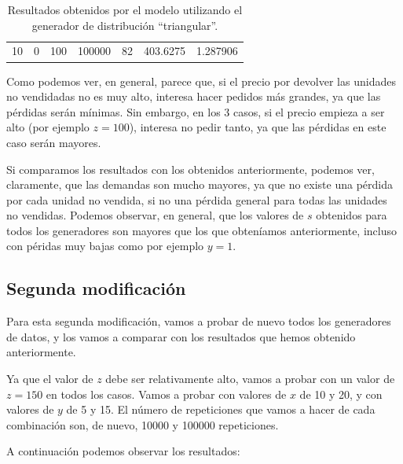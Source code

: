 \documentclass[11pt,a4paper]{report}
\begin{document}
\begin{table}[H]
{\begin{tabular}{c|c|c|c|c|c|c}
10                                                                                   & 0                                                                                      & 100                                                                        & 100000                                                                    & 82                                                                                        & 403.6275                                                                  & 1.287906             
\end{tabular}%
}
\caption{Resultados obtenidos por el modelo utilizando el generador de distribución ``triangular''.}
\label{tabla6}
\end{table}

Como podemos ver, en general, parece que, si el precio por devolver las unidades no vendidadas no es muy alto, interesa hacer
pedidos más grandes, ya que las pérdidas serán mínimas. Sin embargo, en los 3 casos, si el precio empieza a ser alto (por ejemplo
$z = 100$), interesa no pedir tanto, ya que las pérdidas en este caso serán mayores.

Si comparamos los resultados con los obtenidos anteriormente, podemos ver, claramente, que las demandas son mucho mayores, ya
que no existe una pérdida por cada unidad no vendida, si no una pérdida general para todas las unidades no vendidas. Podemos
observar, en general, que los valores de $s$ obtenidos para todos los generadores son mayores que los que obteníamos
anteriormente, incluso con péridas muy bajas como por ejemplo $y = 1$.

\subsection{Segunda modificación}

Para esta segunda modificación, vamos a probar de nuevo todos los generadores de datos, y los vamos a comparar con los
resultados que hemos obtenido anteriormente.

Ya que el valor de $z$ debe ser relativamente alto, vamos a probar con un valor de $z = 150$ en todos los casos. Vamos a probar
con valores de $x$ de 10 y 20, y con valores de $y$ de 5 y 15. El número de repeticiones que vamos a hacer de cada
combinación son, de nuevo, 10000 y 100000 repeticiones.

A continuación podemos observar los resultados:
\end{document}
